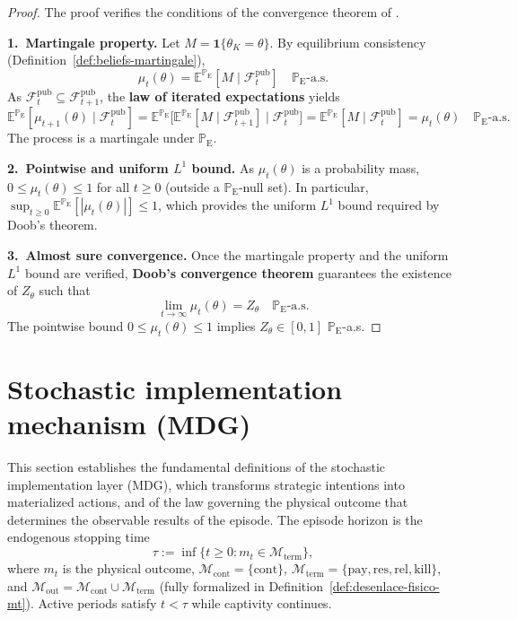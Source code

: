 \documentclass[ecta,nameyear,final,supplement]{econsocart}
\numberwithin{equation}{section}
\numberwithin{table}{section}
\theoremstyle{definition}
\newcommand{\E}{\mathbb{E}}
\newcommand{\ProbE}{\mathbb{P}_{\mathrm{E}}}
\begin{document}
\begin{proof}
The proof verifies the conditions of the convergence theorem of
\citet{Doob1953Stochastic,Williams1991Martingales,Shiryaev2019Probability}.

\smallskip
\noindent\textbf{1.~Martingale property.}
Let $M=\mathbf{1}\{\theta_K=\theta\}$. By equilibrium consistency
(Definition~\ref{def:beliefs-martingale}),
\[
\mu_t(\theta)=\E^{\ProbE}[M\mid\mathcal{F}_t^{\mathrm{pub}}]\quad\ProbE\text{-a.s.}
\]
As $\mathcal{F}_t^{\mathrm{pub}}\subseteq\mathcal{F}_{t+1}^{\mathrm{pub}}$,
the \textbf{law of iterated expectations} yields
\[
\E^{\ProbE}[\mu_{t+1}(\theta)\mid\mathcal{F}_t^{\mathrm{pub}}]
=\E^{\ProbE}\!\bigl[\E^{\ProbE}[M\mid\mathcal{F}_{t+1}^{\mathrm{pub}}]
                     \mid\mathcal{F}_t^{\mathrm{pub}}\bigr]
=\E^{\ProbE}[M\mid\mathcal{F}_t^{\mathrm{pub}}]
=\mu_t(\theta)\quad\ProbE\text{-a.s.}
\]
The process is a martingale under $\ProbE$.

\smallskip
\noindent\textbf{2.~Pointwise and uniform $L^1$ bound.}
As $\mu_t(\theta)$ is a probability mass,
$0\le\mu_t(\theta)\le 1$ for all $t\ge 0$ (outside a
$\ProbE$-null set). In particular,
$\sup_{t\ge 0}\E^{\ProbE}[|\mu_t(\theta)|]\le 1$, which provides the
uniform $L^1$ bound required by Doob's theorem.

\smallskip
\noindent\textbf{3.~Almost sure convergence.}
Once the martingale property and the uniform $L^1$ bound are verified,
\textbf{Doob's convergence theorem} guarantees the existence of
$Z_\theta$ such that
\[
\lim_{t\to\infty}\mu_t(\theta)=Z_\theta\quad\ProbE\text{-a.s.}
\]
The pointwise bound $0\le\mu_t(\theta)\le 1$ implies $Z_\theta\in[0,1]$
$\ProbE$-a.s.
\end{proof}

\section{Stochastic implementation mechanism (MDG)}
\label{sec:mdg}

\noindent This section establishes the fundamental definitions of the
stochastic implementation layer (MDG), which transforms strategic intentions
into materialized actions, and of the law governing the physical outcome that
determines the observable results of the episode. The episode horizon is the
endogenous stopping time
\begin{equation}
\label{eq:stopping-time}
\tau:=\inf\{t\ge 0:m_t\in\mathcal{M}_{\mathrm{term}}\},
\end{equation}
where $m_t$ is the physical outcome,
$\mathcal{M}_{\mathrm{cont}}=\{\mathrm{cont}\}$,
$\mathcal{M}_{\mathrm{term}}=\{\mathrm{pay},\mathrm{res},\mathrm{rel},\mathrm{kill}\}$,
and $\mathcal{M}_{\mathrm{out}}=\mathcal{M}_{\mathrm{cont}}\cup\mathcal{M}_{\mathrm{term}}$
(fully formalized in Definition~\ref{def:desenlace-fisico-mt}). Active
periods satisfy $t<\tau$ while captivity continues.
\end{document}
